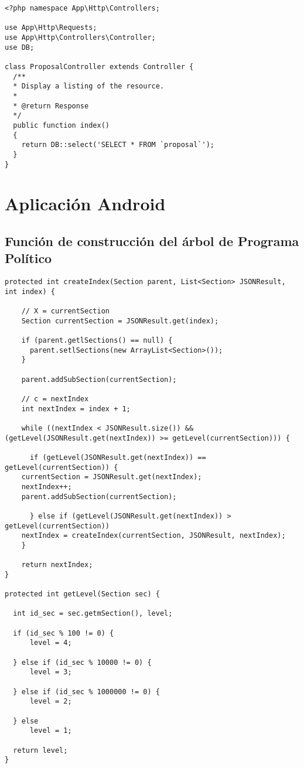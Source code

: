 \lstset{
  language        = php}
\begin{lstlisting}[frame=single]
<?php namespace App\Http\Controllers;

use App\Http\Requests;
use App\Http\Controllers\Controller;
use DB;

class ProposalController extends Controller {
  /**
  * Display a listing of the resource.
  *
  * @return Response
  */
  public function index()
  {
    return DB::select('SELECT * FROM `proposal`');
  }
}
\end{lstlisting}

\section{Aplicación Android}

\subsection{Función de construcción del árbol de Programa Político}\label{ssec:codeProgramTree}

	  \begin{lstlisting}[frame=single]	
protected int createIndex(Section parent, List<Section> JSONResult, int index) {

    // X = currentSection
    Section currentSection = JSONResult.get(index);

    if (parent.getlSections() == null) {
      parent.setlSections(new ArrayList<Section>());
    }
	    
    parent.addSubSection(currentSection);

    // c = nextIndex
    int nextIndex = index + 1;

    while ((nextIndex < JSONResult.size()) && (getLevel(JSONResult.get(nextIndex)) >= getLevel(currentSection))) {
      
      if (getLevel(JSONResult.get(nextIndex)) == getLevel(currentSection)) {
	currentSection = JSONResult.get(nextIndex);
	nextIndex++;
	parent.addSubSection(currentSection);
	
      } else if (getLevel(JSONResult.get(nextIndex)) > getLevel(currentSection))
	nextIndex = createIndex(currentSection, JSONResult, nextIndex);
    }
    
    return nextIndex;
}

protected int getLevel(Section sec) {
  
  int id_sec = sec.getmSection(), level;
  
  if (id_sec % 100 != 0) {
      level = 4;
      
  } else if (id_sec % 10000 != 0) {
      level = 3;
      
  } else if (id_sec % 1000000 != 0) {
      level = 2;
      
  } else
      level = 1;
      
  return level;
}	   
	  \end{lstlisting}
	  
